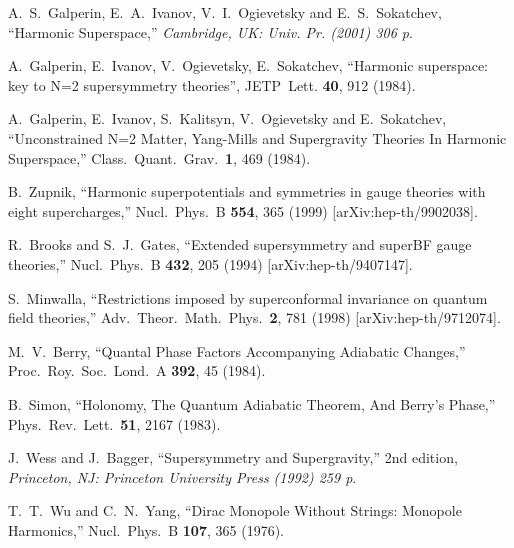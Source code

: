 \documentclass[a4paper,12pt, amsfonts, amssymb]{article}
\begin{document}
\begin{thebibliography}{99}
A.~S.~Galperin, E.~A.~Ivanov, V.~I.~Ogievetsky and E.~S.~Sokatchev,
``Harmonic Superspace,'' {\it  Cambridge, UK: Univ. Pr. (2001) 306 p}.

 A.~Galperin, E.~Ivanov, V.~Ogievetsky, E.~Sokatchev, ``Harmonic superspace:
key to N=2 supersymmetry theories'', JETP\ Lett. {\bf 40}, 912 (1984).

 A.~Galperin, E.~Ivanov, S.~Kalitsyn, V.~Ogievetsky and E.~Sokatchev,
``Unconstrained N=2 Matter, Yang-Mills and Supergravity Theories In Harmonic Superspace,''
Class.\ Quant.\ Grav.\  {\bf 1}, 469 (1984).

 B.~Zupnik, ``Harmonic superpotentials and symmetries in gauge theories with eight  supercharges,''
Nucl.\ Phys.\ B {\bf 554}, 365 (1999) [arXiv:hep-th/9902038].


R.~Brooks and S.~J.~Gates,
``Extended supersymmetry and superBF gauge theories,''
Nucl.\ Phys.\ B {\bf 432}, 205 (1994)
[arXiv:hep-th/9407147].

S.~Minwalla, ``Restrictions imposed by superconformal invariance on quantum field  theories,'' Adv.\ Theor.\ Math.\ Phys.\  {\bf 2}, 781 (1998)
[arXiv:hep-th/9712074].

M.~V.~Berry, ``Quantal Phase Factors Accompanying Adiabatic Changes,''
Proc.\ Roy.\ Soc.\ Lond.\ A {\bf 392}, 45 (1984).

B.~Simon, ``Holonomy, The Quantum Adiabatic Theorem, And Berry's Phase,''
Phys.\ Rev.\ Lett.\  {\bf 51}, 2167 (1983).

J.~Wess and J.~Bagger, ``Supersymmetry and Supergravity,'' 2nd edition,
{\it Princeton, NJ: Princeton University Press (1992) 259 p}.

T.~T.~Wu and C.~N.~Yang, ``Dirac Monopole Without Strings: Monopole
Harmonics,'' Nucl.\ Phys.\ B {\bf 107}, 365 (1976).

\end{thebibliography}
\end{document}
